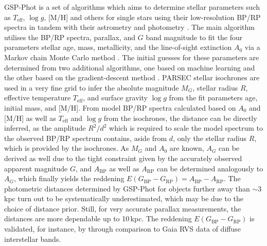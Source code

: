 \documentclass[a4paper,11pt]{article}
\begin{document}
%
GSP-Phot is a set of algorithms which aims to determine stellar parameters such as $T_\mathrm{eff}$, $\log{g}$, [M/H] and others for single stars using their low-resolution BP/RP spectra in tandem with their astrometry and photometry \citep{andrae22}. The main algorithm utilises the BP/RP spectra, parallax, and $G$ band magnitude to fit the four parameters stellar age, mass, metallicity, and the line-of-sight extinction $A_0$ via a Markov chain Monte Carlo method \citep[see q-method in][]{bailerjones11}. The initial guesses for these parameters are determined from two additional algorithms, one based on machine learning \citep{geurts06} and the other based on the gradient-descent method \citep{bailerjones10}. PARSEC stellar isochrones are used in a very fine grid to infer the absolute magnitude $M_G$, stellar radius $R$, effective temperature $T_\mathrm{eff}$, and surface gravity $\log{g}$ from the fit parameters age, initial mass, and [M/H]. From model BP/RP spectra calculated based on $A_0$ and [M/H] as well as $T_\mathrm{eff}$ and $\log{g}$ from the isochrones, the distance can be directly inferred, as the amplitude $R^2/d^2$ which is required to scale the model spectrum to the observed BP/RP spectrum contains, aside from $d$, only the stellar radius $R$, which is provided by the isochrones. As $M_G$ and $A_0$ are known, $A_G$ can be derived as well due to the tight constraint given by the accurately observed apparent magnitude $G$, and $A_\mathrm{BP}$ as well as $A_\mathrm{RP}$ can be determined analogously to $A_G$, which finally yields the reddening $E(G_\mathrm{BP}-G_\mathrm{RP})=A_\mathrm{BP}-A_\mathrm{RP}$. The photometric distances determined by GSP-Phot for objects further away than ${\sim}3$\,kpc turn out to be systematically underestimated, which may be due to the choice of distance prior. Still, for very accurate parallax measurements, the distances are more dependable up to 10\,kpc. The reddening $E(G_\mathrm{BP}-G_\mathrm{RP})$ is validated, for instance, by \citep{schultheis23} through comparison to Gaia RVS data of diffuse interstellar bands.\\ \\
%
\end{document}
